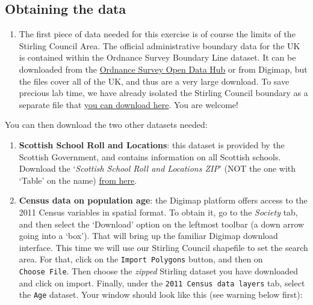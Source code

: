 \documentclass[
  letterpaper,
  DIV=11,
  numbers=noendperiod]{scrreprt}
\providecommand{\tightlist}{%
  \setlength{\itemsep}{0pt}\setlength{\parskip}{0pt}}\usepackage{longtable,booktabs,array}
\begin{document}
\subsection{Obtaining the data}\label{obtaining-the-data}

\begin{enumerate}
\def\labelenumi{(\arabic{enumi})}
\setcounter{enumi}{283}
\tightlist
\item
  The first piece of data needed for this exercise is of course the
  limits of the Stirling Council Area. The official administrative
  boundary data for the UK is contained within the Ordnance Survey
  Boundary Line dataset. It can be downloaded from the
  \href{https://osdatahub.os.uk/}{Ordnance Survey Open Data Hub} or from
  Digimap, but the files cover all of the UK, and thus are a very large
  download. To save precious lab time, we have already isolated the
  Stirling Council boundary as a separate file that
  \href{https://stir-my.sharepoint.com/:u:/g/personal/ala2_stir_ac_uk/Ec19oxQIg-VHi8eiL6A4oFoBishvQS4SutpZ_JVjsZCUcQ?e=coeiWr}{you
  can download here}. You are welcome!
\end{enumerate}

You can then download the two other datasets needed:

\begin{enumerate}
\def\labelenumi{(\arabic{enumi})}
\setcounter{enumi}{284}
\item
  \textbf{Scottish School Roll and Locations}: this dataset is provided
  by the Scottish Government, and contains information on all Scottish
  schools. Download the `\emph{Scottish School Roll and Locations ZIP}'
  (NOT the one with `Table' on the name)
  \href{https://www.data.gov.uk/dataset/9a6f9d86-9698-4a5d-a2c8-89f3b212c52c/scottish-school-roll-and-locations}{from
  here}.
\item
  \textbf{Census data on population age}: the Digimap platform offers
  access to the 2011 Census variables in spatial format. To obtain it,
  go to the \emph{Society} tab, and then select the `Download' option on
  the leftmost toolbar (a down arrow going into a `box'). That will
  bring up the familiar Digimap download interface. This time we will
  use our Stirling Council shapefile to set the search area. For that,
  click on the \texttt{Import\ Polygons} button, and then on
  \texttt{Choose\ File}. Then choose the \emph{zipped} Stirling dataset
  you have downloaded and click on import. Finally, under the
  \texttt{2011\ Census\ data\ layers} tab, select the \texttt{Age}
  dataset. Your window should look like this (see warning below first):
\end{enumerate}
\end{document}
